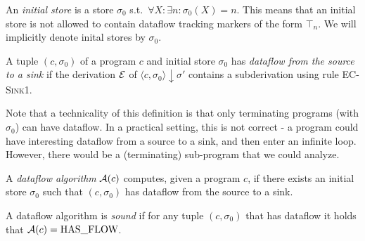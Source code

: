 \begin{definition}
    An \emph{initial store} is a store $\sigma_0$ s.t.\ 
    $\forall X: \exists n: \sigma_0(X) = n$.
    This means that an initial store is not allowed to contain dataflow tracking 
    markers of the form $\top_n$.
    We will implicitly denote inital stores by $\sigma_0$.
\end{definition}

\begin{definition}[Dataflow]
    A tuple $(c, \sigma_0)$ of a program $c$ and initial store $\sigma_0$ 
    has \emph{dataflow from the source to a sink} if the derivation $\operatorname{\mathcal{E}}$
    of $\langle c, \sigma_0 \rangle \downarrow \sigma'$ contains a 
    subderivation using rule \textsc{EC-Sink1}.
\end{definition}
\begin{remark}
    Note that a technicality of this definition is that only terminating programs
(with $\sigma_0$) can have dataflow. 
In a practical setting, this is not correct - a program could have
interesting dataflow from a source to a sink, and then enter an infinite loop.
However, there would be a (terminating) sub-program that we could analyze.
\end{remark}

\begin{definition}
    A \emph{dataflow algorithm} $\operatorname{\mathcal{A}}(c)$ computes, given a program $c$,
    if there exists an initial store $\sigma_0$ 
    such that $(c, \sigma_0)$ has dataflow from the source to a sink.
\end{definition}

\begin{definition}[Soundness]
    A dataflow algorithm is \emph{sound} if for any tuple $(c, \sigma_0)$ that
    has dataflow it holds that $\operatorname{\mathcal{A}}(c) = \text{HAS\_FLOW}$.
\end{definition}

